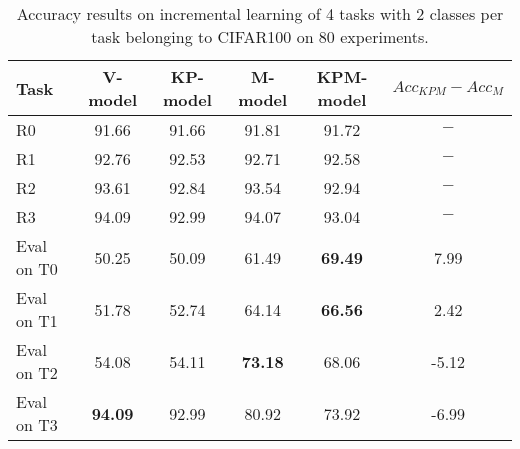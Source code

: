 \begin{table}[H]
\centering
\begin{tabular}{lccccc}
\toprule
Task  & V-model & KP-model & M-model & KPM-model & $Acc_{KPM}-Acc_{M}$ \\
\midrule
R0 & 91.66 & 91.66 & 91.81 & 91.72 & $-$ \\
R1 & 92.76 & 92.53 & 92.71 & 92.58 & $-$ \\
R2 & 93.61 & 92.84 & 93.54 & 92.94 & $-$ \\
R3 & 94.09 & 92.99 & 94.07 & 93.04 & $-$ \\

 \hline 
Eval on T0 & 50.25 & 50.09 & 61.49 & \textbf{69.49} & 7.99 \\
Eval on T1 & 51.78 & 52.74 & 64.14 & \textbf{66.56} & 2.42 \\
Eval on T2 & 54.08 & 54.11 & \textbf{73.18} & 68.06 & -5.12 \\
Eval on T3 & \textbf{94.09} & 92.99 & 80.92 & 73.92 & -6.99 \\
\bottomrule
\end{tabular}
\caption{Accuracy results on incremental learning of 4 tasks with 2 classes per task belonging to CIFAR100 on 80 experiments.}
\end{table}
